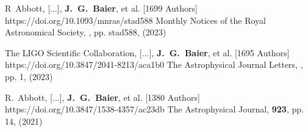          {R~Abbott, [...], \textbf{J.~G.~{Baier}}, et al. [1699 Authors]}
         {https://doi.org/10.1093/mnras/stad588}
         {{Monthly Notices of the Royal Astronomical Society}, \textbf{}, pp. stad588, (2023)}

         {The LIGO Scientific Collaboration, [...], \textbf{J.~G.~{Baier}}, et al. [1695 Authors]}
         {https://doi.org/10.3847/2041-8213/aca1b0}
         {{The Astrophysical Journal Letters}, \textbf{}, pp. 1, (2023)}

         {R.~Abbott, [...], \textbf{J.~G.~{Baier}}, et al. [1380 Authors]}
         {https://doi.org/10.3847/1538-4357/ac23db}
         {{The Astrophysical Journal}, \textbf{923}, pp. 14, (2021)}

